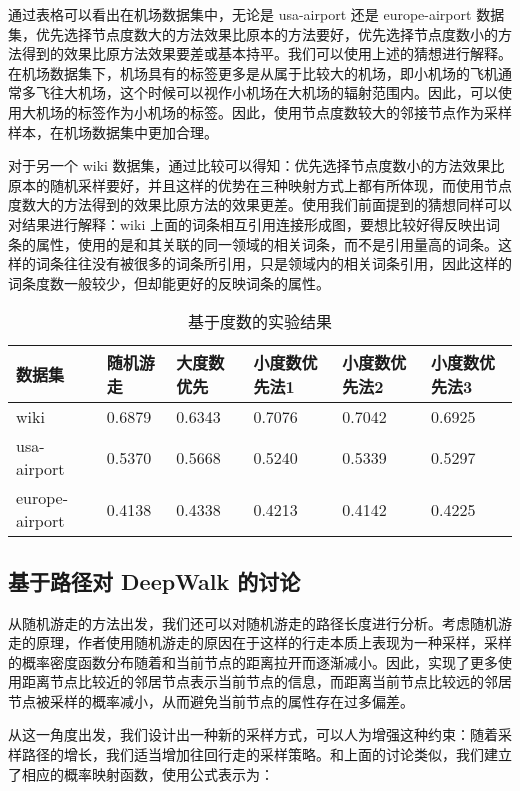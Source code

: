 \documentclass{ctexart}
\begin{document}
通过表格可以看出在机场数据集中，无论是 usa-airport 还是 europe-airport 数据集，优先选择节点度数大的方法效果比原本的方法要好，优先选择节点度数小的方法得到的效果比原方法效果要差或基本持平。我们可以使用上述的猜想进行解释。在机场数据集下，机场具有的标签更多是从属于比较大的机场，即小机场的飞机通常多飞往大机场，这个时候可以视作小机场在大机场的辐射范围内。因此，可以使用大机场的标签作为小机场的标签。因此，使用节点度数较大的邻接节点作为采样样本，在机场数据集中更加合理。

对于另一个 wiki 数据集，通过比较可以得知：优先选择节点度数小的方法效果比原本的随机采样要好，并且这样的优势在三种映射方式上都有所体现，而使用节点度数大的方法得到的效果比原方法的效果更差。使用我们前面提到的猜想同样可以对结果进行解释：wiki 上面的词条相互引用连接形成图，要想比较好得反映出词条的属性，使用的是和其关联的同一领域的相关词条，而不是引用量高的词条。这样的词条往往没有被很多的词条所引用，只是领域内的相关词条引用，因此这样的词条度数一般较少，但却能更好的反映词条的属性。

\begin{table}[!t]
\renewcommand{\arraystretch}{1.1}
\caption{基于度数的实验结果}
\label{exp: deg result}
\centering
\begin{tabular}{|l|l|l|l|l|l|} %
    \hline
    数据集 & 随机游走 & 大度数优先 & 小度数优先法1 & 小度数优先法2 & 小度数优先法3 \\
    \hline
    wiki & 0.6879 & 0.6343 & 0.7076 & 0.7042 & 0.6925 \\
    \hline
    usa-airport & 0.5370 & 0.5668 & 0.5240 & 0.5339 & 0.5297 \\
    \hline
    europe-airport & 0.4138 & 0.4338 & 0.4213 & 0.4142 & 0.4225 \\
    \hline
\end{tabular}
\end{table}

\subsection{基于路径对 DeepWalk 的讨论}

从随机游走的方法出发，我们还可以对随机游走的路径长度进行分析。考虑随机游走的原理，作者使用随机游走的原因在于这样的行走本质上表现为一种采样，采样的概率密度函数分布随着和当前节点的距离拉开而逐渐减小。因此，实现了更多使用距离节点比较近的邻居节点表示当前节点的信息，而距离当前节点比较远的邻居节点被采样的概率减小，从而避免当前节点的属性存在过多偏差。

从这一角度出发，我们设计出一种新的采样方式，可以人为增强这种约束：随着采样路径的增长，我们适当增加往回行走的采样策略。和上面的讨论类似，我们建立了相应的概率映射函数，使用公式表示为：
\end{document}
